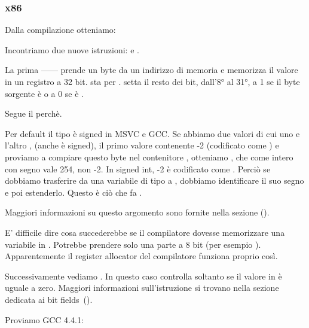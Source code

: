 \subsubsection{x86}


Dalla compilazione otteniamo:




Incontriamo due nuove istruzioni: \MOVSX e \TEST.

\label{MOVSX}
La prima ---\MOVSX--- prende un byte da un indirizzo di memoria e memorizza il valore in un registro a 32 bit. 
\MOVSX sta per . 
\MOVSX setta il resto dei bit, dall'8° al 31°, a 1 se il byte sorgente è  o a 0 se è .

Segue il perchè.

Per default il tipo \Tchar è signed in MSVC e GCC. Se abbiamo due valori di cui uno \Tchar e l'altro 
\Tint, (anche \Tint è signed), il primo valore contenente -2 (codificato come ) e proviamo a compiare questo byte
nel contenitore \Tint, otteniamo , che come intero con segno vale 254, non -2.
In signed int, -2 è codificato come . 
Perciò se dobbiamo trasferire  da una variabile di tipo \Tchar a \Tint, dobbiamo identificare il suo segno e poi estenderlo.
Questo è ciò che fa \MOVSX.

Maggiori informazioni su questo argomento sono fornite nella sezione \q{\IT{\SignedNumbersSectionName}} ().

E' difficile dire cosa succederebbe se il compilatore dovesse memorizzare una variabile \Tchar in \EDX. 
Potrebbe prendere solo una parte a 8 bit (per esempio \DL).
Apparentemente il \gls{register allocator} del compilatore funziona proprio così.


Successivamente vediamo .
In questo caso controlla soltanto se il valore in \EDX è uguale a zero.
Maggiori informazioni sull'istruzione \TEST si trovano nella sezione dedicata ai bit fields~().



Proviamo GCC 4.4.1:



